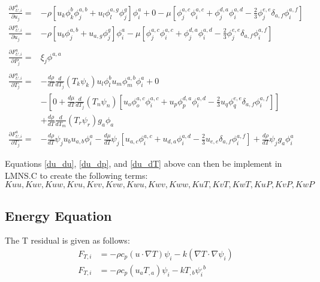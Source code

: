 \begin{align}
   \frac{\partial F_{U,i}^a}{\partial u_j} = &-\rho \left [ u_k \phi_k^b \phi_j^{a,b} + u_l \phi_l^{a,g} \phi_j^g \right ] \phi_i^a 
        + 0 - \mu \left [\phi_j^{a,c} \phi_i^{a,c} + \phi_j^{d,a} \phi_i^{a,d} - \frac{2}{3} \phi_j^{e,e} \delta_{a,f} \phi_i^{a,f} \right ] \nonumber \\     
   \frac{\partial F_{U,i}^a}{\partial u_j} = &-\rho \left [ u_b \phi_j^{a,b} + u_{a,g} \phi_j^g \right ] \phi_i^a 
        - \mu \left [\phi_j^{a,c} \phi_i^{a,c} + \phi_j^{d,a} \phi_i^{a,d} - \frac{2}{3} \phi_j^{e,e} \delta_{a,f} \phi_i^{a,f} \right ] \label{du_du} \\
   \nonumber \\ 
   \frac{\partial F_{U,i}^a}{\partial P_j} = &\xi_j \phi^{a,a} \label{du_dp} \\
   \nonumber \\
   \frac{\partial F_{U,i}^a}{\partial T_j} = &-\frac{d\rho}{dT} \frac{d}{dT_j}(T_k \psi_k) u_l \phi_l^b u_m \phi_m^{a,b} \phi_i^a
        + 0 \nonumber \\ &- \left[ 0 + \frac{d\mu}{dT} \frac{d}{dT_j}(T_n \psi_n) [u_o \phi_o^{a,c} \phi_i^{a,c} + u_p \phi_p^{d,a} \phi_i^{a,d} - \frac{2}{3} u_q \phi_q^{e,e} \delta_{a,f} \phi_i^{a,f} ] \right ] \nonumber
        \\ &+ \frac{d\rho}{dT} \frac{d}{dT_m}(T_r \psi_r) g_a \phi_a \nonumber \\       
   \frac{\partial F_{U,i}^a}{\partial T_j} = &-\frac{d\rho}{dT} \psi_j u_b u_{a,b} \phi_i^a
        - \frac{d\mu}{dT} \psi_j \left [u_{a,c} \phi_i^{a,c} + u_{d,a} \phi_i^{a,d} - \frac{2}{3} u_{e,e} \delta_{a,f} \phi_i^{a,f} \right ]
        + \frac{d\rho}{dT} \psi_j g_a \phi_i^a \label{du_dT} 
\end{align}

Equations \ref{du_du}, \ref{du_dp}, and \ref{du_dT} above can then be implement in LMNS.C to create the following terms:\\
$Kuu, Kuv, Kuw, Kvu, Kvv, Kvw, Kwu, Kwv, Kww, KuT, KvT, KwT, KuP, KvP, KwP$

\newpage
\subsection{Energy Equation}
The T residual is given as follows:
\begin{align}
    F_{T,i} &= -\rho c_p (u \cdot \nabla T) \psi_i - k ( \nabla T \cdot \nabla \psi_i) \\
    F_{T,i} &= -\rho c_p (u_a T_{,a})\psi_i - k T_{,b} \psi_i^{,b}
\end{align}

